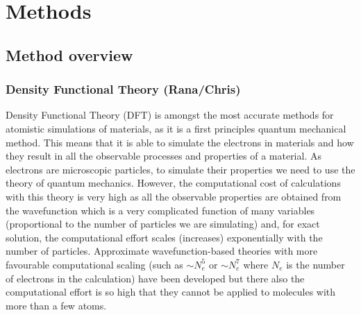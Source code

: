 \documentclass[../main.tex]{subfiles}
\begin{document}
\section{Methods}
\subsection{Method overview}
\label{sec:methods}
    

\subsubsection{Density Functional Theory (Rana/Chris)}
\label{sec:dft}
Density Functional Theory (DFT) is amongst the most accurate methods for atomistic simulations of materials, as it is a first principles quantum mechanical method. This means that it is able to simulate the electrons in materials and how they result in all the observable processes and properties of a  material. As electrons are microscopic particles, to simulate their properties we need to use the theory of quantum mechanics. However, the computational cost of calculations with this theory is very high as all the observable properties are obtained from the wavefunction which is a very complicated function of many variables (proportional to the number of particles we are simulating) and, for exact solution, the computational effort scales (increases) exponentially with the number of particles. Approximate wavefunction-based theories with more favourable computational scaling (such as $\sim N_e^5$ or $\sim N_e^7$ where $N_e$ is the number of electrons in the calculation) have been developed but there also the computational effort is so high that they cannot be applied to molecules with more than a few atoms. 
\end{document}
